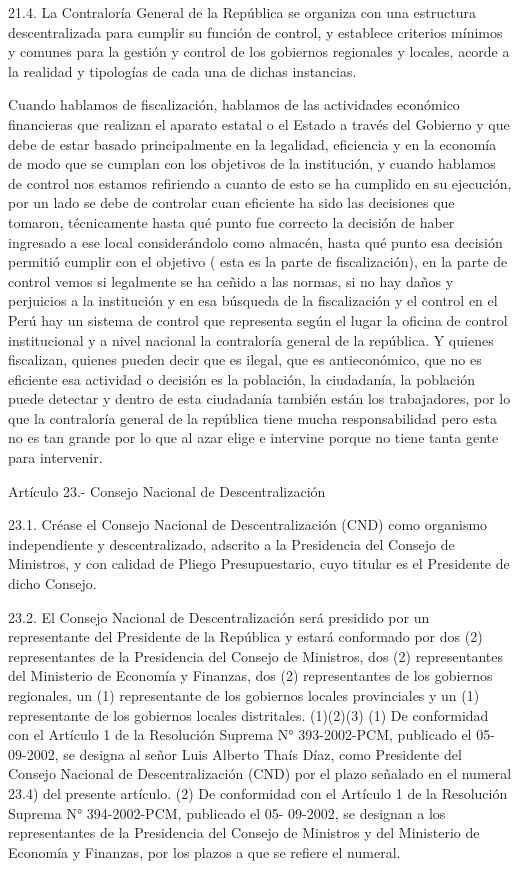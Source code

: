 \documentclass[
  jou,
  floatsintext,
  longtable,
  a4paper,
  nolmodern,
  notxfonts,
  notimes,
  12pt,
  colorlinks=true,linkcolor=blue,citecolor=blue,urlcolor=blue]{apa7}
\begin{document}
21.4. La Contraloría General de la República se organiza con una
estructura descentralizada para cumplir su función de control, y
establece criterios mínimos y comunes para la gestión y control de los
gobiernos regionales y locales, acorde a la realidad y tipologías de
cada una de dichas instancias.

Cuando hablamos de fiscalización, hablamos de las actividades económico
financieras que realizan el aparato estatal o el Estado a través del
Gobierno y que debe de estar basado principalmente en la legalidad,
eficiencia y en la economía de modo que se cumplan con los objetivos de
la institución, y cuando hablamos de control nos estamos refiriendo a
cuanto de esto se ha cumplido en su ejecución, por un lado se debe de
controlar cuan eficiente ha sido las decisiones que tomaron,
técnicamente hasta qué punto fue correcto la decisión de haber ingresado
a ese local considerándolo como almacén, hasta qué punto esa decisión
permitió cumplir con el objetivo ( esta es la parte de fiscalización),
en la parte de control vemos si legalmente se ha ceñido a las normas, si
no hay daños y perjuicios a la institución y en esa búsqueda de la
fiscalización y el control en el Perú hay un sistema de control que
representa según el lugar la oficina de control institucional y a nivel
nacional la contraloría general de la república. Y quienes fiscalizan,
quienes pueden decir que es ilegal, que es antieconómico, que no es
eficiente esa actividad o decisión es la población, la ciudadanía, la
población puede detectar y dentro de esta ciudadanía también están los
trabajadores, por lo que la contraloría general de la república tiene
mucha responsabilidad pero esta no es tan grande por lo que al azar
elige e intervine porque no tiene tanta gente para intervenir.

Artículo 23.- Consejo Nacional de Descentralización

23.1. Créase el Consejo Nacional de Descentralización (CND) como
organismo independiente y descentralizado, adscrito a la Presidencia del
Consejo de Ministros, y con calidad de Pliego Presupuestario, cuyo
titular es el Presidente de dicho Consejo.

23.2. El Consejo Nacional de Descentralización será presidido por un
representante del Presidente de la República y estará conformado por dos
(2) representantes de la Presidencia del Consejo de Ministros, dos (2)
representantes del Ministerio de Economía y Finanzas, dos (2)
representantes de los gobiernos regionales, un (1) representante de los
gobiernos locales provinciales y un (1) representante de los gobiernos
locales distritales. (1)(2)(3) (1) De conformidad con el Artículo 1 de
la Resolución Suprema N° 393-2002-PCM, publicado el 05- 09-2002, se
designa al señor Luis Alberto Thaís Díaz, como Presidente del Consejo
Nacional de Descentralización (CND) por el plazo señalado en el numeral
23.4) del presente artículo. (2) De conformidad con el Artículo 1 de la
Resolución Suprema N° 394-2002-PCM, publicado el 05- 09-2002, se
designan a los representantes de la Presidencia del Consejo de Ministros
y del Ministerio de Economía y Finanzas, por los plazos a que se refiere
el numeral.
\end{document}
